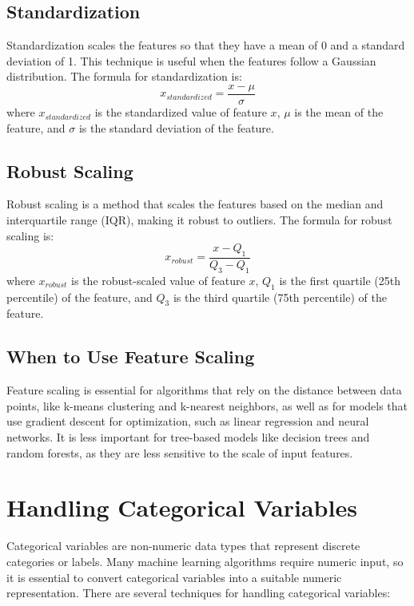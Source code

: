\documentclass[12pt]{article}
\begin{document}
\subsection{Standardization}
Standardization scales the features so that they have a mean of 0 and a standard deviation of 1. This technique is useful when the features follow a Gaussian distribution. The formula for standardization is:
\begin{equation}
x_{standardized} = \frac{x - \mu}{\sigma}
\end{equation}
where $x_{standardized}$ is the standardized value of feature $x$, $\mu$ is the mean of the feature, and $\sigma$ is the standard deviation of the feature.

\subsection{Robust Scaling}
Robust scaling is a method that scales the features based on the median and interquartile range (IQR), making it robust to outliers. The formula for robust scaling is:
\begin{equation}
x_{robust} = \frac{x - Q_{1}}{Q_{3} - Q_{1}}
\end{equation}
where $x_{robust}$ is the robust-scaled value of feature $x$, $Q_{1}$ is the first quartile (25th percentile) of the feature, and $Q_{3}$ is the third quartile (75th percentile) of the feature.

\subsection{When to Use Feature Scaling}
Feature scaling is essential for algorithms that rely on the distance between data points, like k-means clustering and k-nearest neighbors, as well as for models that use gradient descent for optimization, such as linear regression and neural networks. It is less important for tree-based models like decision trees and random forests, as they are less sensitive to the scale of input features.

\section{Handling Categorical Variables}
Categorical variables are non-numeric data types that represent discrete categories or labels. Many machine learning algorithms require numeric input, so it is essential to convert categorical variables into a suitable numeric representation. There are several techniques for handling categorical variables:
\end{document}
